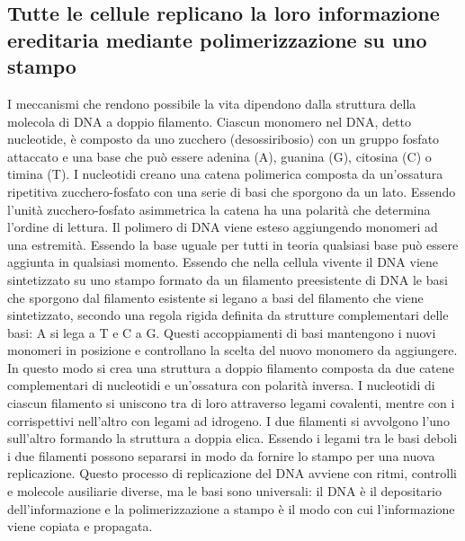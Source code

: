 \subsection{Tutte le cellule replicano la loro informazione ereditaria mediante polimerizzazione su uno stampo}
I meccanismi che rendono possibile la vita dipendono dalla struttura della molecola di DNA a doppio filamento. Ciascun monomero nel DNA, detto nucleotide, 
\`e composto da uno zucchero (desossiribosio) con un gruppo fosfato attaccato e una base che pu\`o essere adenina (A), guanina (G), citosina (C) o timina 
(T). I nucleotidi creano una catena polimerica composta da un'ossatura ripetitiva zucchero-fosfato con una serie di basi che sporgono da un lato. Essendo 
l'unit\`a zucchero-fosfato asimmetrica la catena ha una polarit\`a che determina l'ordine di lettura. Il polimero di DNA viene esteso aggiungendo monomeri 
ad una estremit\`a. Essendo la base uguale per tutti in teoria qualsiasi base pu\`o essere aggiunta in qualsiasi momento. Essendo che nella cellula vivente 
il DNA viene sintetizzato su uno stampo formato da un filamento preesistente di DNA le basi che sporgono dal filamento esistente si legano a basi del 
filamento che viene sintetizzato, secondo una regola rigida definita da strutture complementari delle basi: A si lega a T e C a G. Questi accoppiamenti di 
basi mantengono i nuovi monomeri in posizione e controllano la scelta del nuovo monomero da aggiungere. In questo modo si crea una struttura a doppio 
filamento composta da due catene complementari di nucleotidi e un'ossatura con polarit\`a inversa. I nucleotidi di ciascun filamento si uniscono tra di loro 
attraverso legami covalenti, mentre con i corrispettivi nell'altro con legami ad idrogeno. I due filamenti si avvolgono l'uno sull'altro formando la 
struttura a doppia elica. Essendo i legami tra le basi deboli i due filamenti possono separarsi in modo da fornire lo stampo per una nuova replicazione. 
Questo processo di replicazione del DNA avviene con ritmi, controlli e molecole ausiliarie diverse, ma le basi sono universali: il DNA \`e il depositario 
dell'informazione e la polimerizzazione a stampo \`e il modo con cui l'informazione viene copiata e propagata. 
